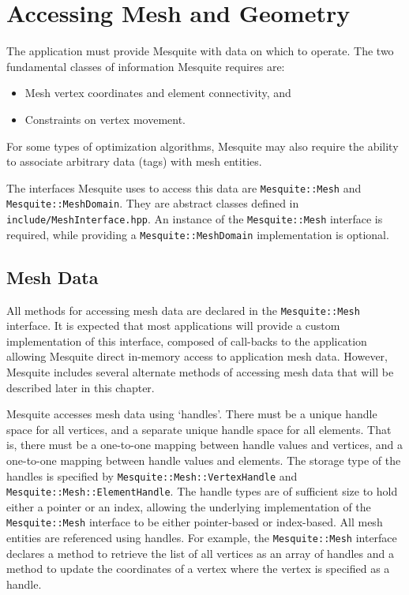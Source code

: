 \chapter{Accessing Mesh and Geometry}
\label{sec:meshes}

The application must provide Mesquite with data on which to operate.  The two
fundamental classes of information Mesquite requires are:
\begin{itemize}
\item Mesh vertex coordinates and element connectivity, and
\item Constraints on vertex movement.
\end{itemize}
For some types of optimization algorithms, Mesquite may also require the ability 
to associate arbitrary data (tags) with mesh entities.

The interfaces Mesquite uses to access this data are \texttt{Mesquite::Mesh}
and \texttt{Mesquite::MeshDomain}.  They are abstract classes defined in
\texttt{include/MeshInterface.hpp}.  An instance of the \texttt{Mesquite::Mesh}
interface is required, while providing a \texttt{Mesquite::MeshDomain}
implementation is optional.

\section{Mesh Data} \label{sec:MeshData}

All methods for accessing mesh data are declared in the \texttt{Mesquite::Mesh}
interface.  It is expected that most applications will provide a custom
implementation of this interface, composed of call-backs to the application
allowing Mesquite direct in-memory access to application mesh data.  However,
Mesquite includes several alternate methods of accessing mesh data that will be
described later in this chapter.

Mesquite accesses mesh data using `handles'.  There must be a unique handle
space for all vertices, and a separate unique handle space for all elements. 
That is, there must be a one-to-one mapping between handle values and vertices,
and a one-to-one mapping between handle values and elements.  The storage type of
the handles is specified by \texttt{Mesquite::Mesh::VertexHandle} and
\texttt{Mesquite::Mesh::ElementHandle}.  The handle types are of sufficient size
to hold either a pointer or an index, allowing the underlying implementation of
the \texttt{Mesquite::Mesh} interface to be either pointer-based or index-based. 
All mesh entities are referenced using handles.  For example, the
\texttt{Mesquite::Mesh} interface declares a method to retrieve the list of all
vertices as an array of handles and a method to update the coordinates of a
vertex where the vertex is specified as a handle.


